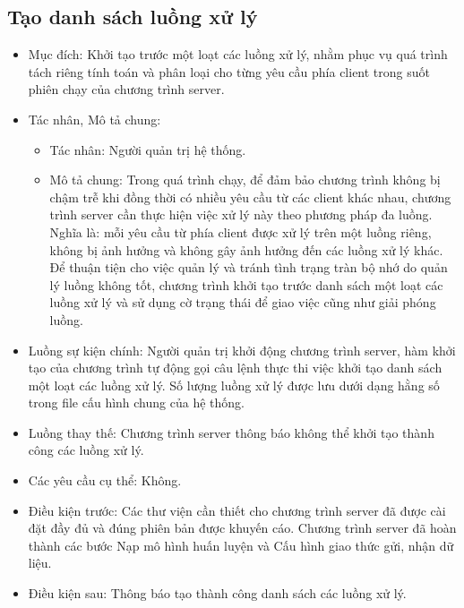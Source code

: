 \subsection{Tạo danh sách luồng xử lý}
\begin{itemize}
	\item Mục đích: Khởi tạo trước một loạt các luồng xử lý, nhằm phục vụ quá trình	tách riêng tính toán và phân loại cho từng yêu cầu phía client trong suốt phiên chạy của chương trình server.
	\item Tác nhân, Mô tả chung:
	\begin{itemize}
		\item Tác nhân: Người quản trị hệ thống.
		\item Mô tả chung: Trong quá trình chạy, để đảm bảo chương trình không bị chậm trễ khi đồng thời có nhiều yêu cầu từ các client khác nhau, chương trình server cần thực hiện việc xử lý này theo phương pháp đa	luồng. Nghĩa là: mỗi yêu cầu từ phía client được xử lý trên một luồng
		riêng, không bị ảnh hưởng và không gây ảnh hưởng đến các luồng xử lý khác. Để thuận tiện cho việc quản lý và tránh tình trạng tràn bộ nhớ do quản lý luồng không tốt, chương trình khởi tạo trước danh sách một loạt các luồng xử lý và sử dụng cờ trạng thái để giao việc cũng như giải phóng luồng.
	\end{itemize}
	\item Luồng sự kiện chính: Người quản trị khởi động chương trình server, hàm khởi tạo của chương trình tự động gọi câu lệnh thực thi việc khởi tạo danh sách	một loạt các luồng xử lý. Số lượng luồng xử lý được lưu dưới dạng hằng số trong file cấu hình chung của hệ thống.
	\item Luồng thay thế: Chương trình server thông báo không thể khởi tạo thành công các luồng xử lý.
	\item Các yêu cầu cụ thể: Không.
	\item Điều kiện trước: Các thư viện cần thiết cho chương trình server đã được cài đặt đầy đủ và đúng phiên bản được khuyến cáo. Chương trình server đã hoàn thành các bước Nạp mô hình huấn luyện và Cấu hình giao thức gửi, nhận dữ	liệu.
	\item Điều kiện sau: Thông báo tạo thành công danh sách các luồng xử lý.
\end{itemize}

